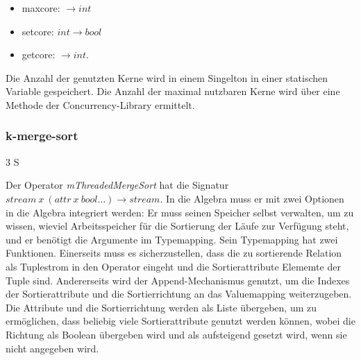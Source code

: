 \documentclass[a4paper,12pt,twoside]{article}
\newcommand{\Fb}[1]{\textit{#1}} %
\begin{document}
\begin{itemize}
	\item maxcore: $\longrightarrow int$
	\item setcore: $int \longrightarrow bool$
	\item getcore: $\longrightarrow int$.
\end{itemize}

Die Anzahl der genutzten Kerne wird in einem Singelton in einer statischen Variable gespeichert. Die Anzahl der maximal nutzbaren Kerne wird über eine Methode der Concurrency-Library ermittelt.

\subsubsection{k-merge-sort} 3 S

Der Operator \Fb{mThreadedMergeSort} hat die Signatur $stream~x~(attr~x~bool \ldots) \longrightarrow stream$. In die Algebra muss er mit zwei Optionen in die Algebra integriert werden: Er muss seinen Speicher selbst verwalten, um zu wissen, wieviel Arbeitsspeicher für die Sortierung der Läufe zur Verfügung steht, und er benötigt die Argumente im Typemapping. Sein Typemapping hat zwei Funktionen. Einerseits muss es sicherzustellen, dass die zu sortierende Relation als Tuplestrom in den Operator eingeht und die Sortierattribute Elememte der Tuple sind. Andererseits wird der Append-Mechanismus genutzt, um die Indexes der Sortierattribute und die Sortierrichtung an das Valuemapping weiterzugeben. Die Attribute und die Sortierrichtung werden als Liste übergeben, um zu ermöglichen, dass beliebig viele Sortierattribute genutzt werden können, wobei die Richtung als Boolean übergeben wird und als aufsteigend gesetzt wird, wenn sie nicht angegeben wird.
\end{document}
